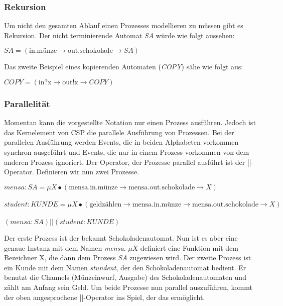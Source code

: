 \subsubsection{Rekursion}
Um nicht den gesamten Ablauf einen Prozesses modellieren zu müssen gibt es Rekursion. Der nicht terminierende Automat \textit{SA} würde wie folgt aussehen:
\begin{addmargin}[1cm]{0cm}
$SA = (\text{in.münze} \rightarrow \text{out.schokolade} \rightarrow SA)$
\end{addmargin}

Das zweite Beispiel eines kopierenden Automaten (\textit{COPY}) sähe wie folgt aus:

\begin{addmargin}[1cm]{0cm}
$COPY = (\text{in?x} \rightarrow \text{out!x} \rightarrow COPY)$
\end{addmargin}

\subsubsection{Parallelität}
Momentan kann die vorgestellte Notation nur einen Prozess ausführen. Jedoch ist das Kernelement von \ac{CSP} die parallele Ausführung von Prozessen. Bei der parallelen Ausführung werden Events, die in beiden Alphabeten vorkommen synchron ausgeführt und Events, die nur in einem Prozess vorkommen von dem anderen Prozess ignoriert. Der Operator, der Prozesse parallel ausführt ist der ||-Operator. Definieren wir nun zwei Prozesse.

\begin{addmargin}[1cm]{0cm}
$mensa:SA = \mu X \bullet (\text{mensa.in.münze} \rightarrow \text{mensa.out.schokolade} \rightarrow X)$\\\\
$student:KUNDE = \mu X \bullet (\text{geldzählen} \rightarrow \text{mensa.in.münze} \rightarrow \text{mensa.out.schokolade} \rightarrow  X)$\\\\
$ (mensa:SA) || (student:KUNDE) $
\end{addmargin}

Der erste Prozess ist der bekannt Schokoladenautomat. Nun ist es aber eine genaue Instanz mit dem Namen \textit{mensa}. $\mu X$ definiert eine Funktion mit dem Bezeichner X, die dann dem Prozess \textit{SA} zugewiesen wird.
Der zweite Prozess ist ein Kunde mit dem Namen \textit{stundent}, der den Schokoladenautomat bedient. Er benutzt die Channels (Münzeinwurf, Ausgabe) des Schokoladenautomaten und zählt am Anfang sein Geld. Um beide Prozesse nun parallel auszuführen, kommt der oben angesprochene ||-Operator ins Spiel, der das ermöglicht.

